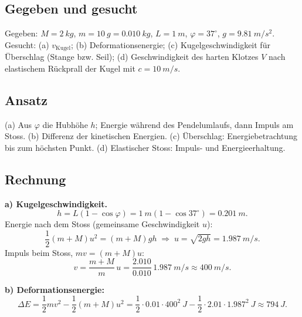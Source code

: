
\subsection*{Gegeben und gesucht}
Gegeben: $M=\qty{2}{kg}$, $m=\qty{10}{g}=\qty{0.010}{kg}$,
$L=\qty{1}{m}$, $\varphi=37^\circ$, $g=\qty{9.81}{m/s^2}$.
Gesucht: (a) $v_\mathrm{Kugel}$; (b) Deformationsenergie; (c)
Kugelgeschwindigkeit für Überschlag (Stange bzw. Seil); (d) Geschwindigkeit
des harten Klotzes $V$ nach elastischem Rückprall der Kugel mit
$c=\qty{10}{m/s}$.

\subsection*{Ansatz}
(a) Aus $\varphi$ die Hubhöhe $h$; Energie während des Pendelumlaufs, dann
Impuls am Stoss. (b) Differenz der kinetischen Energien.
(c) Überschlag: Energiebetrachtung bis zum höchsten Punkt. (d)
Elastischer Stoss: Impuls- und Energieerhaltung.

\subsection*{Rechnung}
\textbf{a) Kugelgeschwindigkeit.}
\begin{equation*}
  h = L(1-\cos\varphi)=\qty{1}{m}(1-\cos 37^\circ)=\qty{0.201}{m}.
\end{equation*}
Energie nach dem Stoss (gemeinsame Geschwindigkeit $u$):
\begin{equation}
  \frac12 (m+M)u^2 = (m+M)gh
  \;\Rightarrow\;
  u=\sqrt{2gh}=\qty{1.987}{m/s}.
\end{equation}
Impuls beim Stoss, $m v=(m+M)u$:
\begin{equation}
  v = \frac{m+M}{m}\,u
  = \frac{2.010}{0.010}\,\qty{1.987}{m/s}
  \approx \qty{400}{m/s}.
\end{equation}

\textbf{b) Deformationsenergie:}
\begin{equation}
  \Delta E = \frac12 m v^2 - \frac12 (m+M)u^2
  = \frac12\cdot 0.01\cdot 400^2\ \si{J}
    - \frac12\cdot 2.01\cdot 1.987^2\ \si{J}
  \approx \qty{794}{J}.
\end{equation}

